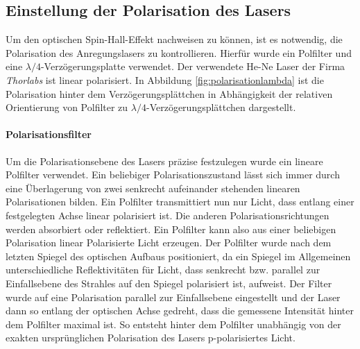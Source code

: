 \documentclass[titlepage]{article}
\begin{document}
\subsection{Einstellung der Polarisation des Lasers}
		Um den optischen Spin-Hall-Effekt nachweisen zu können, ist es notwendig, die Polarisation des Anregungslasers zu kontrollieren. Hierfür wurde ein Polfilter und eine $\lambda /4$-Verzögerungsplatte verwendet. Der verwendete He-Ne Laser der Firma \textit{Thorlabs} ist linear polarisiert. In Abbildung \ref{fig:polarisationlambda} ist die Polarisation hinter dem Verzögerungsplättchen in Abhängigkeit der relativen Orientierung von Polfilter zu $\lambda /4$-Verzögerungsplättchen dargestellt. 
	\paragraph{Polarisationsfilter}	
		 Um die Polarisationsebene des Lasers präzise festzulegen wurde ein lineare Polfilter verwendet. Ein beliebiger Polarisationszustand lässt sich immer durch eine Überlagerung von zwei senkrecht aufeinander stehenden linearen Polarisationen bilden. Ein Polfilter transmittiert nun nur Licht, dass entlang einer festgelegten Achse linear polarisiert ist. Die anderen Polarisationsrichtungen werden absorbiert oder reflektiert. Ein Polfilter kann also aus einer beliebigen Polarisation linear Polarisierte Licht erzeugen. Der  Polfilter wurde nach dem letzten Spiegel des optischen Aufbaus positioniert, da ein Spiegel im Allgemeinen unterschiedliche Reflektivitäten für Licht, dass senkrecht bzw. parallel zur Einfallsebene des Strahles auf den Spiegel polarisiert ist, aufweist. Der Filter wurde auf eine Polarisation parallel zur Einfallsebene eingestellt und der Laser dann so entlang der optischen Achse gedreht, dass die gemessene Intensität hinter dem Polfilter maximal ist. So entsteht hinter dem Polfilter unabhängig  von der exakten ursprünglichen Polarisation des Lasers p-polarisiertes Licht.
\end{document}
